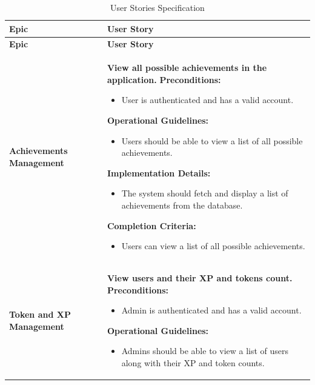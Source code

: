 \begin{longtable}{ | p{} | p{} | }
    \caption{User Stories Specification} \\
    \hline
    \rowcolor{primary}  \textbf{Epic} & \textbf{User Story} \\
    \hline
    \endfirsthead
    \hline
    \rowcolor{primary} \textbf{Epic} & \textbf{User Story} \\
    \hline
    \endhead
    \hline
    \endfoot
    \endlastfoot
    \textbf{Achievements Management} & \textbf{View all possible achievements in the application.} \newline
    \textbf{Preconditions:} \newline
    \begin{itemize}
        \item User is authenticated and has a valid account.
    \end{itemize}
    \textbf{Operational Guidelines:} \newline
    \begin{itemize}
        \item Users should be able to view a list of all possible achievements.
    \end{itemize}
    \textbf{Implementation Details:} \newline
    \begin{itemize}
        \item The system should fetch and display a list of achievements from the database.
    \end{itemize}
    \textbf{Completion Criteria:} \newline
    \begin{itemize}
        \item Users can view a list of all possible achievements.
    \end{itemize} \\
    \hline
    \multirow{5}{=}{\textbf{Token and XP Management}} & \textbf{View users and their XP and tokens count.} \newline
    \textbf{Preconditions:} \newline
    \begin{itemize}
        \item Admin is authenticated and has a valid account.
    \end{itemize}
    \textbf{Operational Guidelines:} \newline
    \begin{itemize}
        \item Admins should be able to view a list of users along with their XP and token counts.

\end{itemize}
\end{longtable}
